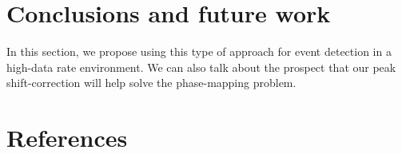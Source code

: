 \documentclass[12pt]{iopart}
\begin{document}

\section{Conclusions and future work}

In this section, we propose using this type of approach for event
detection in a high-data rate environment. We can also talk about
the prospect that our peak shift-correction will help solve the
phase-mapping problem.


\section{References}
\end{document}
